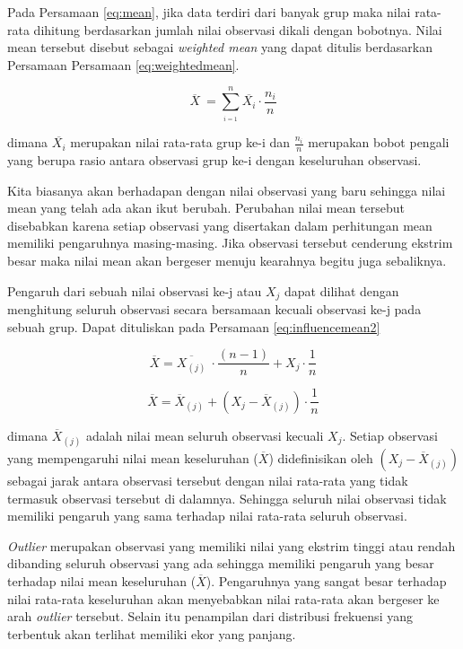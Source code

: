 \documentclass[]{book}
\begin{document}
Pada Persamaan \eqref{eq:mean}, jika data terdiri dari banyak grup maka
nilai rata-rata dihitung berdasarkan jumlah nilai observasi dikali
dengan bobotnya. Nilai mean tersebut disebut sebagai \emph{weighted
mean} yang dapat ditulis berdasarkan Persamaan Persamaan
\eqref{eq:weightedmean}.

\begin{equation}
  \overline{X}\ =\text{}\sum_{_{i=1}}^n\overline{X_i}\cdot\frac{n_i}{n}
  \label{eq:weightedmean}
\end{equation}

dimana \(\overline{X_i}\) merupakan nilai rata-rata grup ke-i dan
\(\frac{n_i}{n}\) merupakan bobot pengali yang berupa rasio antara
observasi grup ke-i dengan keseluruhan observasi.

Kita biasanya akan berhadapan dengan nilai observasi yang baru sehingga
nilai mean yang telah ada akan ikut berubah. Perubahan nilai mean
tersebut disebabkan karena setiap observasi yang disertakan dalam
perhitungan mean memiliki pengaruhnya masing-masing. Jika observasi
tersebut cenderung ekstrim besar maka nilai mean akan bergeser menuju
kearahnya begitu juga sebaliknya.

Pengaruh dari sebuah nilai observasi ke-j atau \(X_j\) dapat dilihat
dengan menghitung seluruh observasi secara bersamaan kecuali observasi
ke-j pada sebuah grup. Dapat dituliskan pada Persamaan
\eqref{eq:influencemean2}

\begin{equation}
  \overline{X} =\text{}\overline{X_{\left(j\right)}}\ \cdot\frac{\left(n-1\right)}{n}+X_j\cdot\frac{1}{n}
  \label{eq:influencemean1}
\end{equation}

\begin{equation}
  \overline{X} =\overline{X}_{\left(j\right)}+\left(X_j-\overline{X}_{\left(j\right)}\right)\cdot\frac{1}{n}
  \label{eq:influencemean2}
\end{equation}

dimana \(\overline{X}_{\left(j\right)}\) adalah nilai mean seluruh
observasi kecuali \(X_j\). Setiap observasi yang mempengaruhi nilai mean
keseluruhan (\(\overline{X}\)) didefinisikan oleh
\(\left(X_j-\overline{X}_{\left(j\right)}\right)\) sebagai jarak antara
observasi tersebut dengan nilai rata-rata yang tidak termasuk observasi
tersebut di dalamnya. Sehingga seluruh nilai observasi tidak memiliki
pengaruh yang sama terhadap nilai rata-rata seluruh observasi.

\emph{Outlier} merupakan observasi yang memiliki nilai yang ekstrim
tinggi atau rendah dibanding seluruh observasi yang ada sehingga
memiliki pengaruh yang besar terhadap nilai mean keseluruhan
(\(\overline{X}\)). Pengaruhnya yang sangat besar terhadap nilai
rata-rata keseluruhan akan menyebabkan nilai rata-rata akan bergeser ke
arah \emph{outlier} tersebut. Selain itu penampilan dari distribusi
frekuensi yang terbentuk akan terlihat memiliki ekor yang panjang.
\end{document}

